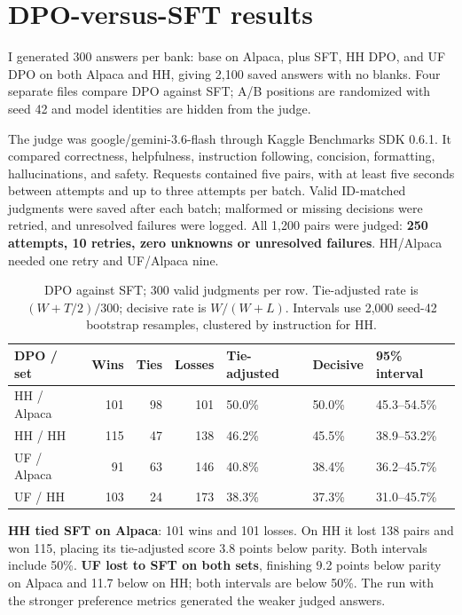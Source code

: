 \documentclass[11pt,a4paper]{article}
\newcommand{\model}[1]{\textsf{#1}}
\begin{document}
\section{DPO-versus-SFT results}
I generated 300 answers per bank: base on Alpaca, plus SFT, HH DPO, and UF DPO on both Alpaca and HH, giving 2,100 saved answers with no blanks. Four separate files compare DPO against SFT; A/B positions are randomized with seed 42 and model identities are hidden from the judge.

The judge was \model{google/gemini-3.6-flash} through Kaggle Benchmarks SDK 0.6.1. It compared correctness, helpfulness, instruction following, concision, formatting, hallucinations, and safety. Requests contained five pairs, with at least five seconds between attempts and up to three attempts per batch. Valid ID-matched judgments were saved after each batch; malformed or missing decisions were retried, and unresolved failures were logged. All 1,200 pairs were judged: \textbf{250 attempts, 10 retries, zero unknowns or unresolved failures}. HH/Alpaca needed one retry and UF/Alpaca nine.

\begin{table}[H]
\centering\small
\begin{tabularx}{\linewidth}{@{}lrrrYYY@{}}\toprule
DPO / set & Wins & Ties & Losses & Tie-adjusted & Decisive & 95\% interval\\\midrule
HH / Alpaca & 101 & 98 & 101 & 50.0\% & 50.0\% & 45.3--54.5\%\\
HH / HH & 115 & 47 & 138 & 46.2\% & 45.5\% & 38.9--53.2\%\\
UF / Alpaca & 91 & 63 & 146 & 40.8\% & 38.4\% & 36.2--45.7\%\\
UF / HH & 103 & 24 & 173 & 38.3\% & 37.3\% & 31.0--45.7\%\\\bottomrule
\end{tabularx}
\caption{DPO against SFT; 300 valid judgments per row. Tie-adjusted rate is $(W+T/2)/300$; decisive rate is $W/(W+L)$. Intervals use 2,000 seed-42 bootstrap resamples, clustered by instruction for HH.}
\end{table}

\textbf{HH tied SFT on Alpaca}: 101 wins and 101 losses. On HH it lost 138 pairs and won 115, placing its tie-adjusted score 3.8 points below parity. Both intervals include 50\%. \textbf{UF lost to SFT on both sets}, finishing 9.2 points below parity on Alpaca and 11.7 below on HH; both intervals are below 50\%. The run with the stronger preference metrics generated the weaker judged answers.
\end{document}
